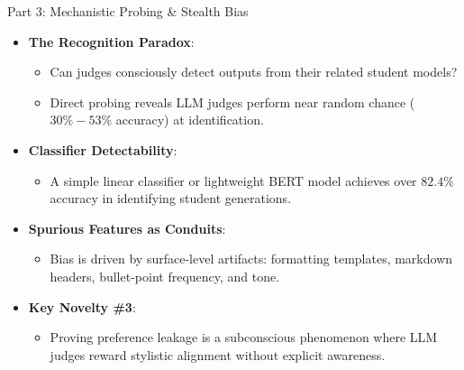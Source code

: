 \documentclass[10pt]{beamer}
\begin{document}
	\begin{frame}{Part 3: Mechanistic Probing \& Stealth Bias}
		\begin{itemize}
			\item \textbf{The Recognition Paradox}:
			\begin{itemize}
				\item Can judges consciously detect outputs from their related student models?
				\item Direct probing reveals LLM judges perform near random chance ($30\% - 53\%$ accuracy) at identification.
			\end{itemize}
			\vspace{0.2cm}
			\item \textbf{Classifier Detectability}:
			\begin{itemize}
				\item A simple linear classifier or lightweight BERT model achieves over $82.4\%$ accuracy in identifying student generations.
			\end{itemize}
			\vspace{0.2cm}
			\item \textbf{Spurious Features as Conduits}:
			\begin{itemize}
				\item Bias is driven by surface-level artifacts: formatting templates, markdown headers, bullet-point frequency, and tone.
			\end{itemize}
			\vspace{0.2cm}
			\item \textbf{Key Novelty \#3}:
			\begin{itemize}
				\item Proving preference leakage is a subconscious phenomenon where LLM judges reward stylistic alignment without explicit awareness.
			\end{itemize}
		\end{itemize}
	\end{frame}
	
	
\end{document}
